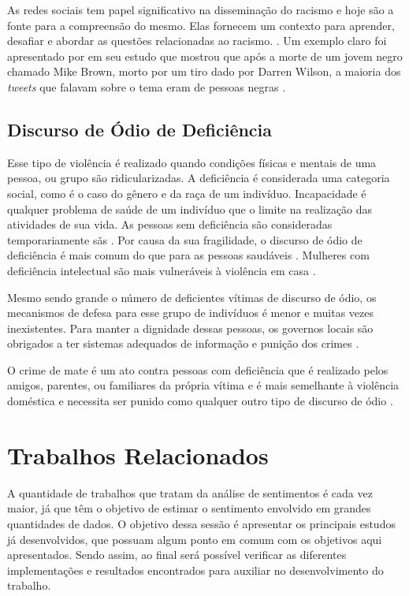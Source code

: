 As redes sociais tem papel significativo na disseminação do racismo e hoje são a fonte para a compreensão do mesmo. Elas fornecem um contexto para aprender, desafiar e abordar as questões relacionadas ao racismo.  \cite{Chetty2018}. Um exemplo claro foi apresentado por  em seu estudo que mostrou que após a morte de um jovem negro  chamado Mike Brown, morto por um tiro dado por Darren Wilson, a maioria dos \textit{tweets} que falavam sobre o tema eram de pessoas negras \cite{Chaudhry2016}.

\subsection{Discurso de Ódio de Deficiência}

Esse tipo de violência é realizado quando condições físicas e mentais de uma pessoa, ou grupo são ridicularizadas. A deficiência é considerada uma categoria social, como é o caso do gênero e da raça de um indivíduo. Incapacidade é qualquer problema de saúde de um indivíduo que o limite na realização das atividades de sua vida. As pessoas sem deficiência são consideradas temporariamente sãs \cite{doi:10.1086/ahr/108.3.763}. Por causa da sua fragilidade, o discurso de ódio de deficiência é mais comum do que para as pessoas saudáveis \cite{Chetty2018}. Mulheres com deficiência intelectual são mais vulneráveis à violência em casa \cite{McCarthy2017}. 

Mesmo sendo grande o número de deficientes vítimas de discurso de ódio, os mecanismos de defesa para esse grupo de indivíduos é menor e muitas vezes inexistentes. Para manter a dignidade dessas pessoas, os governos locais são obrigados a ter sistemas adequados de informação e punição dos crimes \cite{Macdonald2017}.

O crime de mate é um ato contra pessoas com deficiência que é realizado pelos amigos, parentes, ou familiares da própria vítima e é mais semelhante à violência doméstica e necessita ser punido como qualquer outro tipo de discurso de ódio \cite{Chetty2018}. 

\section{Trabalhos Relacionados}
A quantidade de trabalhos que tratam da análise de sentimentos é cada vez maior, já que têm o objetivo de estimar o sentimento envolvido em grandes quantidades de dados. O objetivo dessa sessão é apresentar os principais estudos já desenvolvidos, que possuam algum ponto em comum com os objetivos aqui apresentados. Sendo assim, ao final será possível verificar as diferentes implementações e resultados encontrados para auxiliar no desenvolvimento do trabalho.

